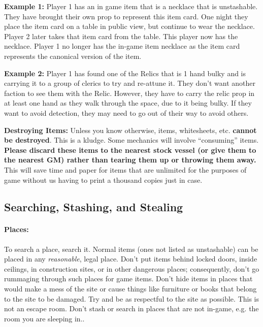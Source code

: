 \documentclass[sheet]{GL2020}
\begin{document}
\textbf{Example 1:}\newline
Player 1 has an in game item that is a necklace that is unstashable. They have brought their own prop to represent this item card. One night they place the item card on a table in public view, but continue to wear the necklace. Player 2 later takes that item card from the table. This player now has the necklace. Player 1 no longer has the in-game item necklace as the item card represents the canonical version of the item.

\textbf{Example 2:}\newline
Player 1 has found one of the Relics that is 1 hand bulky and is carrying it to a group of clerics to try and re-attune it. They don’t want another faction to see them with the Relic. However, they have to carry the relic prop in at least one hand as they walk through the space, due to it being bulky. If they want to avoid detection, they may need to go out of their way to avoid others.

\textbf{Destroying Items:} Unless you know otherwise, items, whitesheets, etc. \textbf{cannot be destroyed}. This is a kludge. Some mechanics will involve ``consuming'' items. \textbf{Please discard these items to the nearest stock vessel (or give them to the nearest GM) rather than tearing them up or throwing them away.} This will save time and paper for items that are unlimited for the purposes of game without us having to print a thousand copies just in case.

\subsection{Searching, Stashing, and Stealing}

\paragraph{Places:} To search a place, search it. Normal items (ones not listed as unstashable) can be placed in any \emph{reasonable}, legal place. Don't put items behind locked doors, inside ceilings, in construction sites, or in other dangerous places; consequently, don't go rummaging through such places for game items. Don’t hide items in places that would make a mess of the site or cause things like furniture or books that belong to the site to be damaged. Try and be as respectful to the site as possible. This is not an escape room. Don't stash or search in places that are not in-game, e.g. the room you are sleeping in..
\end{document}
